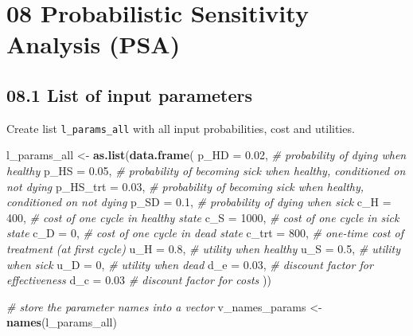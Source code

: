 \documentclass[
]{article}
\newenvironment{Shaded}{\begin{snugshade}}{\end{snugshade}}
\newcommand{\CommentTok}[1]{\textcolor[rgb]{0.56,0.35,0.01}{\textit{#1}}}
\newcommand{\DataTypeTok}[1]{\textcolor[rgb]{0.13,0.29,0.53}{#1}}
\newcommand{\DecValTok}[1]{\textcolor[rgb]{0.00,0.00,0.81}{#1}}
\newcommand{\FloatTok}[1]{\textcolor[rgb]{0.00,0.00,0.81}{#1}}
\newcommand{\KeywordTok}[1]{\textcolor[rgb]{0.13,0.29,0.53}{\textbf{#1}}}
\newcommand{\NormalTok}[1]{#1}
\newcommand{\StringTok}[1]{\textcolor[rgb]{0.31,0.60,0.02}{#1}}
\begin{document}
\hypertarget{probabilistic-sensitivity-analysis-psa}{%
\section{08 Probabilistic Sensitivity Analysis
(PSA)}\label{probabilistic-sensitivity-analysis-psa}}

\hypertarget{list-of-input-parameters}{%
\subsection{08.1 List of input
parameters}\label{list-of-input-parameters}}

Create list \texttt{l\_params\_all} with all input probabilities, cost
and utilities.

\begin{Shaded}
\begin{Highlighting}[]
\NormalTok{l_params_all <-}\StringTok{ }\KeywordTok{as.list}\NormalTok{(}\KeywordTok{data.frame}\NormalTok{(}
  \DataTypeTok{p_HD     =} \FloatTok{0.02}\NormalTok{,  }\CommentTok{# probability of dying when healthy}
  \DataTypeTok{p_HS     =} \FloatTok{0.05}\NormalTok{,  }\CommentTok{# probability of becoming sick when healthy, conditioned on not dying}
  \DataTypeTok{p_HS_trt =} \FloatTok{0.03}\NormalTok{,  }\CommentTok{# probability of becoming sick when healthy, conditioned on not dying}
  \DataTypeTok{p_SD     =} \FloatTok{0.1}\NormalTok{,   }\CommentTok{# probability of dying when sick}
  \DataTypeTok{c_H      =} \DecValTok{400}\NormalTok{,   }\CommentTok{# cost of one cycle in healthy state}
  \DataTypeTok{c_S      =} \DecValTok{1000}\NormalTok{,  }\CommentTok{# cost of one cycle in sick state}
  \DataTypeTok{c_D      =} \DecValTok{0}\NormalTok{,     }\CommentTok{# cost of one cycle in dead state}
  \DataTypeTok{c_trt    =} \DecValTok{800}\NormalTok{,   }\CommentTok{# one-time cost of treatment (at first cycle)}
  \DataTypeTok{u_H      =} \FloatTok{0.8}\NormalTok{,   }\CommentTok{# utility when healthy }
  \DataTypeTok{u_S      =} \FloatTok{0.5}\NormalTok{,   }\CommentTok{# utility when sick}
  \DataTypeTok{u_D      =} \DecValTok{0}\NormalTok{,     }\CommentTok{# utility when dead}
  \DataTypeTok{d_e      =} \FloatTok{0.03}\NormalTok{,  }\CommentTok{# discount factor for effectiveness}
  \DataTypeTok{d_c      =} \FloatTok{0.03}   \CommentTok{# discount factor for costs}
\NormalTok{))}

\CommentTok{# store the parameter names into a vector}
\NormalTok{v_names_params <-}\StringTok{ }\KeywordTok{names}\NormalTok{(l_params_all)}
\end{Highlighting}
\end{Shaded}
\end{document}
